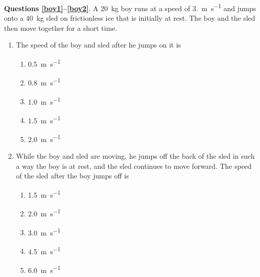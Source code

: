\documentclass{../../../oss-apphys}
\begin{document}
\begin{multicols}{2}
\begin{enumerate}[leftmargin=18pt,resume]
  \end{enumerate}
    
  \textbf{Questions \ref{boy1}--\ref{boy2}}. A \SI{20}{\kilo\gram} boy runs at
  a speed of \SI{3.}{\metre\per\second} and jumps onto a \SI{40}{\kilo\gram}
  sled on frictionless ice that is initially at rest. The boy and the sled then
  move together for a short time.
  \begin{enumerate}[resume,leftmargin=18pt]
  \item The speed of the boy and sled after he jumps on it is
    \label{boy1}
    \begin{enumerate}[nosep,leftmargin=18pt,label=(\Alph*)]
    \item\SI{0.5}{\metre\per\second}
    \item\SI{0.8}{\metre\per\second}
    \item\SI{1.0}{\metre\per\second}
    \item\SI{1.5}{\metre\per\second}
    \item\SI{2.0}{\metre\per\second}
    \end{enumerate}
    
  \item While the boy and sled are moving, he jumps off the back of the sled in
    such a way the boy is at rest, and the sled continues to move forward.
    The speed of the sled after the boy jumps off is
    \label{boy2}
    \begin{enumerate}[nosep,leftmargin=18pt,label=(\Alph*)]
    \item\SI{1.5}{\metre\per\second}
    \item\SI{2.0}{\metre\per\second}
    \item\SI{3.0}{\metre\per\second}
    \item\SI{4.5}{\metre\per\second}
    \item\SI{6.0}{\metre\per\second}
    \end{enumerate}
    \columnbreak
    

\end{enumerate}
\end{multicols}
\end{document}
